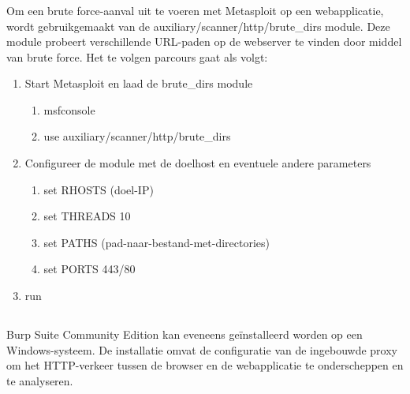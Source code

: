 \subsubsection{}
Om een brute force-aanval uit te voeren met Metasploit op een webapplicatie, wordt gebruikgemaakt van de auxiliary\slash scanner\slash http\slash brute\_dirs
module. Deze module probeert verschillende URL-paden op de webserver te vinden door middel van brute force.
Het te volgen parcours gaat als volgt:
\begin{enumerate}
    \item Start Metasploit en laad de brute\_dirs module
    \begin{enumerate}
        \item msfconsole
        \item use auxiliary\slash scanner\slash http\slash brute\_dirs
    \end{enumerate}
    \item Configureer de module met de doelhost en eventuele andere parameters
    \begin{enumerate}
        \item set RHOSTS (doel-IP)
        \item set THREADS 10
        \item set PATHS (pad-naar-bestand-met-directories)
        \item set PORTS 443\slash 80 
    \end{enumerate}
    \item run
\end{enumerate}
\subsection{}
Burp Suite Community Edition kan eveneens geïnstalleerd worden op een Windows-systeem. De installatie omvat de configuratie 
van de ingebouwde proxy om het HTTP-verkeer tussen de browser en de webapplicatie te onderscheppen en te analyseren.

